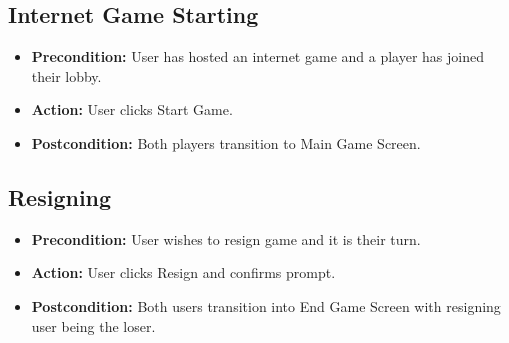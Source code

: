 \subsection{Internet Game Starting}
\begin{itemize}
  \item
    \textbf{Precondition:} User has hosted an internet game and a player has
    joined their lobby.
  \item
    \textbf{Action:} User clicks Start Game.
  \item
    \textbf{Postcondition:} Both players transition to Main Game Screen.
\end{itemize}

\subsection{Resigning}
\begin{itemize}
  \item
    \textbf{Precondition:} User wishes to resign game and it is their turn.
  \item
    \textbf{Action:} User clicks Resign and confirms prompt.
  \item
    \textbf{Postcondition:} Both users transition into End Game Screen with
    resigning user being the loser.
\end{itemize}
